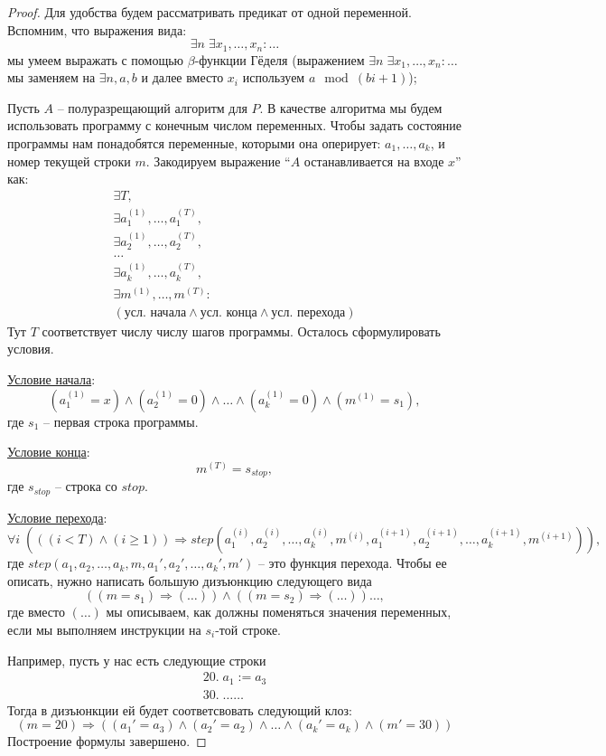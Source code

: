 \begin{proof}
    Для удобства будем рассматривать предикат от одной переменной. Вспомним, что выражения вида: \[ \exists n \; \exists x_1, \dots, x_n : \dots \] мы умеем выражать с помощью $\beta$-функции Гёделя (выражением $\exists n \; \exists x_1, \dots, x_n : \dots$ мы заменяем на $\exists n, a, b$ и далее вместо $x_i$ используем $a \mod (bi + 1)$); 

    Пусть $A$ -- полуразрещающий алгоритм для $P$. В качестве алгоритма мы будем использовать программу с конечным числом переменных. Чтобы задать состояние программы нам понадобятся переменные, которыми она оперирует: $a_1, \dots, a_k$, и номер текущей строки $m$. Закодируем выражение ``$A$ останавливается на входе $x$'' как: \begin{gather*}
        \exists T, \\
        \exists a_1^{(1)}, \dots, a_1^{(T)}, \\
        \exists a_2^{(1)}, \dots, a_2^{(T)}, \\
        \dots \\
        \exists a_k^{(1)}, \dots, a_k^{(T)}, \\
        \exists m^{(1)}, \dots, m^{(T)} : \\
        (\text{усл. начала} \land \text{усл. конца} \land \text{усл. перехода})
    \end{gather*}
    Тут $T$ соответствует числу числу шагов программы. Осталось сформулировать условия.

    \underline{Условие начала}: \[ (a_1^{(1)} = x) \land (a_2^{(1)} = 0) \land \dots \land (a_k^{(1)} = 0) \land (m^{(1)} = s_1), \] где $s_1$ -- первая строка программы.
    
    \underline{Условие конца}: \[ m^{(T)} = s_{stop}, \] где $s_{stop}$ -- строка со $stop$.

    \underline{Условие перехода}: \[ \forall i \; (((i < T) \land (i \geqslant 1)) \Rightarrow step(a_1^{(i)}, a_2^{(i)}, \dots, a_k^{(i)}, m^{(i)}, a_1^{(i+1)}, a_2^{(i+1)}, \dots, a_k^{(i+1)}, m^{(i+1)})), \] где $step(a_1, a_2, \dots, a_k, m, a_1', a_2', \dots, a_k', m')$ -- это функция перехода. Чтобы ее описать, нужно написать большую дизъюнкцию следующего вида \[ ((m = s_1) \Rightarrow (\dots)) \land ((m = s_2) \Rightarrow (\dots)) \dots, \] где вместо $(\dots)$ мы описываем, как должны поменяться значения переменных, если мы выполняем инструкции на $s_i$-той строке.

    Например, пусть у нас есть следующие строки \begin{gather*}
        20. \; a_1 := a_3 \\
        30. \; \dots \dots \;
    \end{gather*}  
    Тогда в дизъюнкции ей будет соответсвовать следующий клоз: \[ (m = 20) \Rightarrow ((a_1' = a_3) \land (a_2' = a_2) \land \dots \land (a_k' = a_k) \land(m' = 30)) \]
    Построение формулы завершено.
\end{proof}

